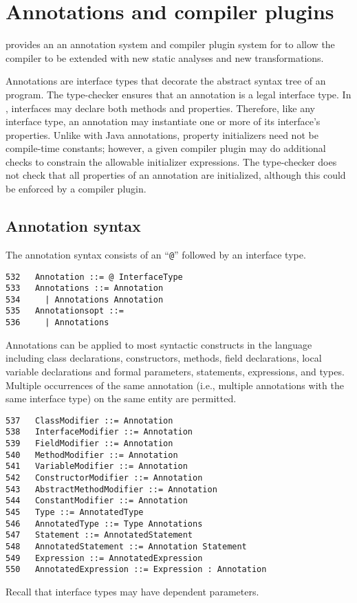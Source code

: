 \chapter{Annotations and compiler plugins}\label{XtenAnnotations}


\Xten{} provides an 
an annotation system and compiler plugin system for to allow the
compiler to be extended with new static analyses and new
transformations.

Annotations are interface types that decorate the abstract syntax tree
of an \Xten{} program.  The \Xten{} type-checker ensures that an annotation
is a legal interface type.
In \Xten{}, interfaces may declare
both methods and properties.  Therefore, like any interface type, an
annotation may instantiate
one or more of its interface's properties.
Unlike with Java
annotations,
property initializers need not be
compile-time constants;
however, a given compiler plugin
may do additional checks to constrain the allowable
initializer expressions.
The \Xten{} type-checker does not check that
all properties of an annotation are initialized,
although this could be enforced by
a compiler plugin.

\section{Annotation syntax}

The annotation syntax consists of an ``\texttt{@}'' followed by an interface type.
\begin{verbatim}
532   Annotation ::= @ InterfaceType
533   Annotations ::= Annotation
534     | Annotations Annotation
535   Annotationsopt ::=
536     | Annotations
\end{verbatim}
Annotations can be applied to most syntactic constructs in the language
including class declarations, constructors, methods, field declarations,
local variable declarations and formal parameters, statements,
expressions, and types.
Multiple occurrences of the same annotation (i.e., multiple
annotations with the same interface type) on the same entity are permitted.

\begin{verbatim}
537   ClassModifier ::= Annotation
538   InterfaceModifier ::= Annotation
539   FieldModifier ::= Annotation
540   MethodModifier ::= Annotation
541   VariableModifier ::= Annotation
542   ConstructorModifier ::= Annotation
543   AbstractMethodModifier ::= Annotation
544   ConstantModifier ::= Annotation
545   Type ::= AnnotatedType
546   AnnotatedType ::= Type Annotations
547   Statement ::= AnnotatedStatement
548   AnnotatedStatement ::= Annotation Statement
549   Expression ::= AnnotatedExpression
550   AnnotatedExpression ::= Expression : Annotation
\end{verbatim}
\noindent
Recall that interface types may have dependent parameters.

